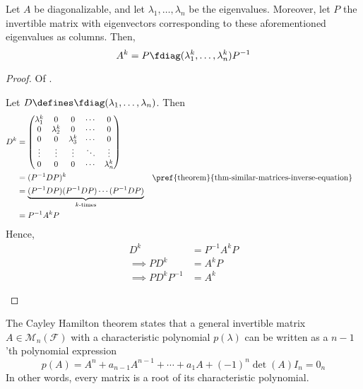 \begin{thm}\label{thm-power-of-diagonalizable-matrix}
	Let $A$ be diagonalizable, and let $\lambda_1,\dots,\lambda_n$ be the eigenvalues.
	Moreover, let $P$ the invertible matrix with eigenvectors corresponding to these
	aforementioned eigenvalues as columns. Then,
	\begin{equation}
		A^k = P\fdiag(\lambda_1^k,\dots,\lambda_n^k)P^{-1}
	\end{equation}
\end{thm}

\begin{proof}
	Of .
	\begin{flushleft}
		Let $D\defines\fdiag(\lambda_1,\dots,\lambda_n)$. Then
		\begin{align*}
			D^k & = \begin{pmatrix}
				\lambda_1^k & 0           & 0           & \cdots & 0           \\
				0           & \lambda_2^k & 0           & \cdots & 0           \\
				0           & 0           & \lambda_3^k & \cdots & 0           \\
				\vdots      & \vdots      & \vdots      & \ddots & \vdots      \\
				0           & 0           & 0           & \cdots & \lambda_n^k
			\end{pmatrix}                                                                                                          \\
			    & = (P^{-1}DP)^k                                                       &  & \text{\pref{theorem}{thm-similar-matrices-inverse-equation}} \\
			    & = \underbrace{(P^{-1}DP)(P^{-1}DP)\cdots(P^{-1}DP)}_{k\text{-times}}                                                                   \\
			    & = P^{-1}A^kP
		\end{align*}
		Hence,
		\begin{align*}
			D^k                   & = P^{-1}A^kP \\
			\implies P D^k        & = A^kP       \\
			\implies P D^k P^{-1} & = A^k
		\end{align*}
	\end{flushleft}
\end{proof}

\begin{thm}\label{thm-cayley-hamilton-theorem}
	The Cayley Hamilton theorem states that a general invertible matrix $A\in\mathcal{M}_n(\mathcal{F})$
	with a characteristic polynomial $p(\lambda)$ can be written as a $n-1$'th
	polynomial expression
	\begin{equation}
		p(A)=A^n+a_{n-1}A^{n-1}+\cdots+a_1A+(-1)^n\det(A)I_n=0_n
	\end{equation}
	In other words, every matrix is a root of its characteristic polynomial.
\end{thm}

